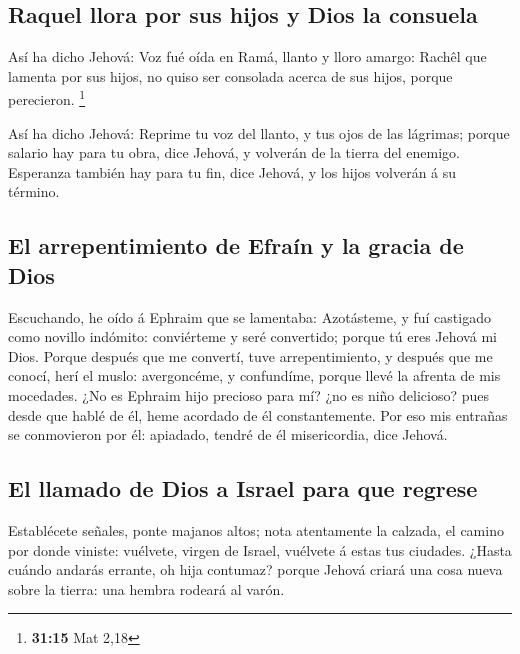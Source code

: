 \hypertarget{raquel-llora-por-sus-hijos-y-dios-la-consuela}{%
\subsection{Raquel llora por sus hijos y Dios la
consuela}\label{raquel-llora-por-sus-hijos-y-dios-la-consuela}}

 Así ha dicho Jehová: Voz fué oída en Ramá, llanto y
lloro amargo: Rachêl que lamenta por sus hijos, no quiso ser consolada
acerca de sus hijos, porque perecieron. \footnote{\textbf{31:15} Mat
  2,18}

 Así ha dicho Jehová: Reprime tu voz del llanto, y tus
ojos de las lágrimas; porque salario hay para tu obra, dice Jehová, y
volverán de la tierra del enemigo.  Esperanza también hay
para tu fin, dice Jehová, y los hijos volverán á su término.

\hypertarget{el-arrepentimiento-de-efrauxedn-y-la-gracia-de-dios}{%
\subsection{El arrepentimiento de Efraín y la gracia de
Dios}\label{el-arrepentimiento-de-efrauxedn-y-la-gracia-de-dios}}

 Escuchando, he oído á Ephraim que se lamentaba:
Azotásteme, y fuí castigado como novillo indómito: conviérteme y seré
convertido; porque tú eres Jehová mi Dios.  Porque
después que me convertí, tuve arrepentimiento, y después que me conocí,
herí el muslo: avergoncéme, y confundíme, porque llevé la afrenta de mis
mocedades.  ¿No es Ephraim hijo precioso para mí? ¿no es
niño delicioso? pues desde que hablé de él, heme acordado de él
constantemente. Por eso mis entrañas se conmovieron por él: apiadado,
tendré de él misericordia, dice Jehová.

\hypertarget{el-llamado-de-dios-a-israel-para-que-regrese}{%
\subsection{El llamado de Dios a Israel para que
regrese}\label{el-llamado-de-dios-a-israel-para-que-regrese}}

 Establécete señales, ponte majanos altos; nota
atentamente la calzada, el camino por donde viniste: vuélvete, virgen de
Israel, vuélvete á estas tus ciudades.  ¿Hasta cuándo
andarás errante, oh hija contumaz? porque Jehová criará una cosa nueva
sobre la tierra: una hembra rodeará al varón.

